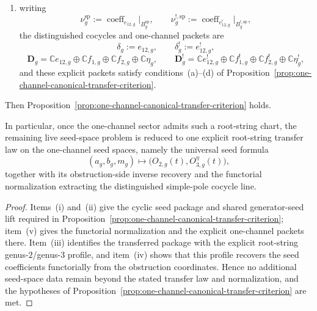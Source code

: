 \begin{proposition}
\begin{enumerate}[label=\textup{(\roman*)}]
  \[
  \begin{aligned}
  a_g&=t^{-2}\operatorname{coeff}_{e_{12,g}}\!\bigl(O_{2,g}(t)\bigr), \\
  b_g&=t^{-2}\operatorname{coeff}_{f_{1,g}}\!\bigl(O_{2,g}(t)\bigr), \\
  m_g&=-t^{-2}\operatorname{coeff}_{f_{2,g}}\!\bigl(O_{2,g}(t)\bigr),
  \end{aligned}
  \]
  \[
  a_gm_g
  =
  t^{-3}\operatorname{coeff}_{\eta_g}\!\bigl(O_{3,g}^\eta(t)\bigr),
  \]
  and likewise on the dual side;
\item writing
  \[
  \nu_g^{\mathrm{sp}}
  :=
  \operatorname{coeff}_{e_{12,g}}\big|_{B_g^{\mathrm{sp}}},
  \qquad
  \nu_g^{!,\mathrm{sp}}
  :=
  \operatorname{coeff}_{e_{12,g}^!}\big|_{B_g^{!,\mathrm{sp}}},
  \]
  the distinguished cocycles and one-channel packets are
  \[
  \delta_g:=e_{12,g},
  \qquad
  \delta_g^!:=e_{12,g}^!,
  \]
  \[
  \mathbf{D}_g
  =
  \mathbb{C}e_{12,g}\oplus\mathbb{C}f_{1,g}\oplus\mathbb{C}f_{2,g}\oplus\mathbb{C}\eta_g,
  \qquad
  \mathbf{D}_g^!
  =
  \mathbb{C}e_{12,g}^!\oplus\mathbb{C}f_{1,g}^!\oplus\mathbb{C}f_{2,g}^!\oplus\mathbb{C}\eta_g^!,
  \]
  and these explicit packets satisfy conditions~\textup{(a)}--\textup{(d)}
  of Proposition~\textup{\ref{prop:one-channel-canonical-transfer-criterion}}.
\end{enumerate}
Then Proposition~\ref{prop:one-channel-canonical-transfer-criterion}
holds.

In particular, once the one-channel sector admits such a root-string
chart, the remaining live seed-space problem is reduced to one explicit
root-string transfer law on the one-channel seed spaces, namely the
universal seed formula
\[
(a_g,b_g,m_g)\longmapsto\bigl(O_{2,g}(t),O_{3,g}^\eta(t)\bigr),
\]
together with its obstruction-side inverse recovery and the functorial
normalization extracting the distinguished simple-pole cocycle line.
\end{proposition}

\begin{proof}
Items~\textup{(i)} and~\textup{(ii)} give the cyclic seed package and
shared generator-seed lift required in
Proposition~\ref{prop:one-channel-canonical-transfer-criterion};
item~\textup{(v)} gives the functorial normalization and the explicit
one-channel packets there.  Item~\textup{(iii)} identifies the
transferred package with the explicit root-string genus-$2$/genus-$3$
profile, and item~\textup{(iv)} shows that this profile recovers the
seed coefficients functorially from the obstruction coordinates.
Hence no additional seed-space data remain beyond the stated transfer
law and normalization, and the hypotheses of
Proposition~\ref{prop:one-channel-canonical-transfer-criterion} are met.
\end{proof}

